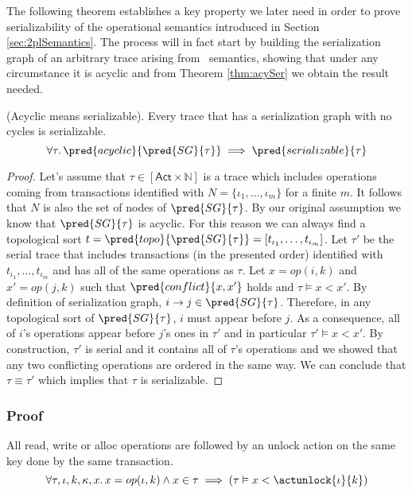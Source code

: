 The following theorem establishes a key property we later need in order to prove serializability of the operational semantics introduced in Section \ref{sec:2plSemantics}. The process will in fact start by building the serialization graph of an arbitrary trace arising from \tpl\ semantics, showing that under any circumstance it is acyclic and from Theorem \ref{thm:acySer} we obtain the result needed.
\begin{thm}
	\label{thm:acySer}
	(Acyclic means serializable).
	Every trace that has a serialization graph with no cycles is serializable.
	\[
		\forall \tau \ldotp \pred{acyclic}{\pred{SG}{\tau}} \implies \pred{serializable}{\tau}
	\]
	
	\begin{proof}
	Let's assume that $\tau \in [\mathsf{Act} \times \mathds{N}]$ is a trace which includes operations coming from transactions identified with $N = \{ \iota_1, \ldots, \iota_m \}$ for a finite $m$. It follows that $N$ is also the set of nodes of $\pred{SG}{\tau}$. By our original assumption we know that $\pred{SG}{\tau}$ is acyclic. For this reason we can always find a topological sort $t = \pred{topo}{\pred{SG}{\tau}} = [t_{\iota_1}, \ldots, t_{\iota_m}]$. Let $\tau'$ be the serial trace that includes transactions (in the presented order) identified with $t_{\iota_1}, \ldots, t_{\iota_m}$ and has all of the same operations as $\tau$. Let $x = op(i, k)$ and $x' = op(j, k)$ such that $\pred{conflict}{x, x'}$ holds and $\tau \vDash x < x'$. By definition of serialization graph, $i \rightarrow j \in \pred{SG}{\tau}$. Therefore, in any topological sort of $\pred{SG}{\tau}$, $i$ must appear before $j$. As a consequence, all of $i$'s operations appear before $j$'s ones in $\tau'$ and in particular $\tau' \vDash x < x'$. By construction, $\tau'$ is serial and it contains all of $\tau$'s operations and we showed that any two conflicting operations are ordered in the same way. We can conclude that $\tau \equiv \tau'$ which implies that $\tau$ is serializable.
	\end{proof}
\end{thm}

\subsubsection{Proof}

\begin{lem}
	All read, write or alloc operations are followed by an unlock action on the same key done by the same transaction.
	\[
		\forall \tau, \iota, k, \kappa, x \ldotp
		x = op(\iota, k) \land x \in \tau \implies \left( \tau \vDash x < \actunlock{\iota}{k} \right)
	\]
\end{lem}

